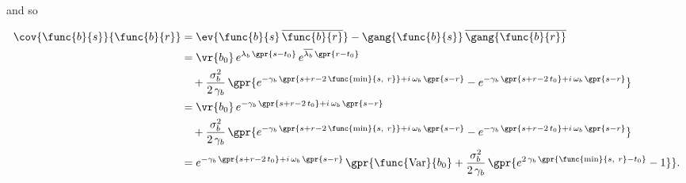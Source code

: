 and so

\begin{align}
    \cov{\func{b}{s}}{\func{b}{r}} &= \ev{\func{b}{s}\,\overline{\func{b}{r}}} - \gang{\func{b}{s}}\,\overline{\gang{\func{b}{r}}} \nonumber \\
    	&= \vr{b_0}\,e^{\lambda_{b}\,\gpr{s - t_0}}\,e^{\overline{\lambda_{b}}\,\gpr{r - t_0}} \nonumber \\
    		&\quad + \frac{\sigma_{b}^{2}}{2\,\gamma_{b}}\,\gpr{e^{-\gamma_{b}\,\gpr{s + r - 2\,\func{\text{min}}{s,\ r}} + i\,\omega_{b}\,\gpr{s - r}} - e^{-\gamma_{b}\,\gpr{s + r - 2\,t_{0}} + i\,\omega_{b}\,\gpr{s - r}}} \nonumber \\
    	&= \vr{b_0}\,e^{-\gamma_{b}\,\gpr{s + r - 2\,t_0} + i\,\omega_{b}\,\gpr{s - r}} \nonumber \\
    		&\quad + \frac{\sigma_{b}^{2}}{2\,\gamma_{b}}\,\gpr{e^{-\gamma_{b}\,\gpr{s + r - 2\,\func{\text{min}}{s,\ r}} + i\,\omega_{b}\,\gpr{s - r}} - e^{-\gamma_{b}\,\gpr{s + r - 2\,t_{0}} + i\,\omega_{b}\,\gpr{s - r}}} \nonumber \\
    	&= e^{-\gamma_{b}\,\gpr{s + r - 2\,t_0} + i\,\omega_{b}\,\gpr{s - r}}\,\gpr{\func{\text{Var}}{b_0} + \frac{\sigma_{b}^{2}}{2\,\gamma_{b}}\,\gpr{e^{2\,\gamma_b\,\gpr{\func{\text{min}}{s,\ r} - t_0}} - 1}}. \label{eqn:cov_bs_br}
\end{align}